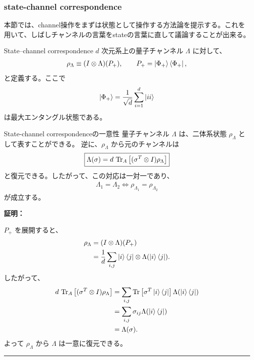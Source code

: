 \documentclass[a4paper,10.5pt]{article}
\numberwithin{equation}{section}
\newenvironment{proofbox}
{\begin{prooflabel}\textbf{証明：}\end{prooflabel}\vspace{0.8em}}
{\par\vspace{1em}\hrule\vspace{1em}}
\begin{document}
\subsubsection{state-channel correspondence}
本節では、channel操作をまずは状態として操作する方法論を提示する。これを用いて、しばしチャンネルの言葉をstateの言葉に直して議論することが出来る。
\begin{defbox}{State--channel correspondence}
$d$ 次元系上の量子チャンネル $\Lambda$ に対して、
\begin{align*}
    \rho_\Lambda
    \equiv
    (I\otimes\Lambda)(P_+),
    \qquad
    P_+=\ket{\Phi_+}\bra{\Phi_+},
\end{align*}
と定義する。ここで
\begin{align*}
    \ket{\Phi_+}
    =
    \frac{1}{\sqrt d}\sum_{i=1}^{d}\ket{ii}
\end{align*}
は最大エンタングル状態である。
\end{defbox}
\begin{resultbox}{State-channel correspondenceの一意性}
量子チャンネル $\Lambda$ は、二体系状態 $\rho_\Lambda$ として表すことができる。
逆に、$\rho_\Lambda$ から元のチャンネルは
\begin{align*}
    \boxed{
    \Lambda(\sigma)
    =
    d\,\Tr_A
    \left[
        (\sigma^T\otimes I)\rho_\Lambda
    \right]
    }
\end{align*}
と復元できる。したがって、この対応は一対一であり、
\begin{align*}
    \boxed{
    \Lambda_1=\Lambda_2
    \iff
    \rho_{\Lambda_1}=\rho_{\Lambda_2}
    }
\end{align*}
が成立する。
\end{resultbox}
\begin{proofbox}
$P_+$ を展開すると、
\begin{align*}
    \rho_\Lambda
    &=
    (I\otimes\Lambda)(P_+)\\
    &=
    \frac{1}{d}
    \sum_{i,j}
    \ket{i}\bra{j}
    \otimes
    \Lambda(\ket{i}\bra{j}).
\end{align*}
したがって、
\begin{align*}
    d\,\Tr_A
    \left[
        (\sigma^T\otimes I)\rho_\Lambda
    \right]
    &=
    \sum_{i,j}
    \Tr
    \left[
        \sigma^T\ket{i}\bra{j}
    \right]
    \Lambda(\ket{i}\bra{j})\\
    &=
    \sum_{i,j}
    \sigma_{ij}\Lambda(\ket{i}\bra{j})\\
    &=
    \Lambda(\sigma).
\end{align*}
よって $\rho_\Lambda$ から $\Lambda$ は一意に復元できる。
\end{proofbox}
\end{document}
